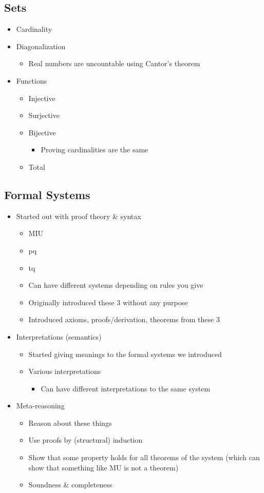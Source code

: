 \documentclass[11pt]{article}
\begin{document}
\subsection{Sets}
\label{sec:orgd160f2b}
\begin{itemize}
\item Cardinality
\item Diagonalization
\begin{itemize}
\item Real numbers are uncountable using Cantor's theorem
\end{itemize}
\item Functions
\begin{itemize}
\item Injective
\item Surjective
\item Bijective
\begin{itemize}
\item Proving cardinalities are the same
\end{itemize}
\item Total
\end{itemize}
\end{itemize}
\subsection{Formal Systems}
\label{sec:org29f76eb}
\begin{itemize}
\item Started out with proof theory \& syntax
\begin{itemize}
\item MIU
\item pq
\item tq
\item Can have different systems depending on rules you give
\item Originally introduced these 3 without any purpose
\item Introduced axioms, proofs/derivation, theorems from these 3
\end{itemize}
\item Interpretations (semantics)
\begin{itemize}
\item Started giving meanings to the formal systems we introduced
\item Various interpretations
\begin{itemize}
\item Can have different interpretations to the same system
\end{itemize}
\end{itemize}
\item Meta-reasoning
\begin{itemize}
\item Reason about these things
\item Use proofs by (structural) induction
\item Show that some property holds for all theorems of the system (which can show that something like MU is not a theorem)
\item Soundness \& completeness
\end{itemize}
\end{itemize}
\end{document}
